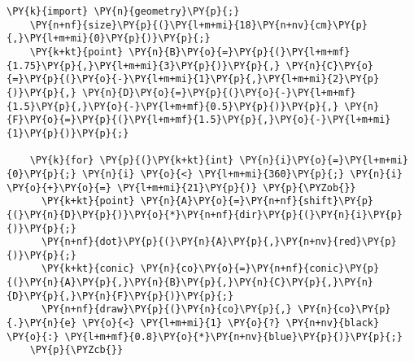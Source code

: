 \begin{Verbatim}[commandchars=\\\{\}]
    \PY{k}{import} \PY{n}{geometry}\PY{p}{;}
    \PY{n+nf}{size}\PY{p}{(}\PY{l+m+mi}{18}\PY{n+nv}{cm}\PY{p}{,}\PY{l+m+mi}{0}\PY{p}{)}\PY{p}{;}
    \PY{k+kt}{point} \PY{n}{B}\PY{o}{=}\PY{p}{(}\PY{l+m+mf}{1.75}\PY{p}{,}\PY{l+m+mi}{3}\PY{p}{)}\PY{p}{,} \PY{n}{C}\PY{o}{=}\PY{p}{(}\PY{o}{-}\PY{l+m+mi}{1}\PY{p}{,}\PY{l+m+mi}{2}\PY{p}{)}\PY{p}{,} \PY{n}{D}\PY{o}{=}\PY{p}{(}\PY{o}{-}\PY{l+m+mf}{1.5}\PY{p}{,}\PY{o}{-}\PY{l+m+mf}{0.5}\PY{p}{)}\PY{p}{,} \PY{n}{F}\PY{o}{=}\PY{p}{(}\PY{l+m+mf}{1.5}\PY{p}{,}\PY{o}{-}\PY{l+m+mi}{1}\PY{p}{)}\PY{p}{;}

    \PY{k}{for} \PY{p}{(}\PY{k+kt}{int} \PY{n}{i}\PY{o}{=}\PY{l+m+mi}{0}\PY{p}{;} \PY{n}{i} \PY{o}{<} \PY{l+m+mi}{360}\PY{p}{;} \PY{n}{i} \PY{o}{+}\PY{o}{=} \PY{l+m+mi}{21}\PY{p}{)} \PY{p}{\PYZob{}}
      \PY{k+kt}{point} \PY{n}{A}\PY{o}{=}\PY{n+nf}{shift}\PY{p}{(}\PY{n}{D}\PY{p}{)}\PY{o}{*}\PY{n+nf}{dir}\PY{p}{(}\PY{n}{i}\PY{p}{)}\PY{p}{;}
      \PY{n+nf}{dot}\PY{p}{(}\PY{n}{A}\PY{p}{,}\PY{n+nv}{red}\PY{p}{)}\PY{p}{;}
      \PY{k+kt}{conic} \PY{n}{co}\PY{o}{=}\PY{n+nf}{conic}\PY{p}{(}\PY{n}{A}\PY{p}{,}\PY{n}{B}\PY{p}{,}\PY{n}{C}\PY{p}{,}\PY{n}{D}\PY{p}{,}\PY{n}{F}\PY{p}{)}\PY{p}{;}
      \PY{n+nf}{draw}\PY{p}{(}\PY{n}{co}\PY{p}{,} \PY{n}{co}\PY{p}{.}\PY{n}{e} \PY{o}{<} \PY{l+m+mi}{1} \PY{o}{?} \PY{n+nv}{black} \PY{o}{:} \PY{l+m+mf}{0.8}\PY{o}{*}\PY{n+nv}{blue}\PY{p}{)}\PY{p}{;}
    \PY{p}{\PYZcb{}}
\end{Verbatim}
